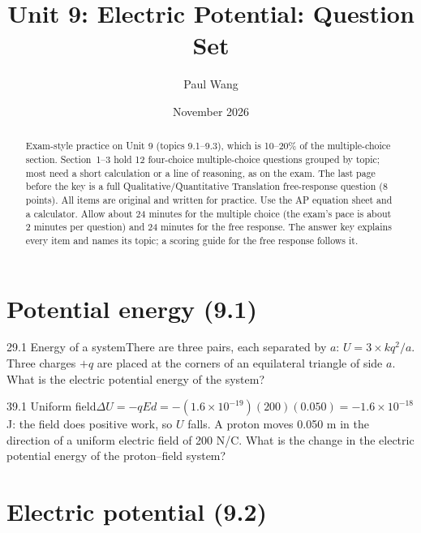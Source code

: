 \documentclass[11pt]{article}
\title{Unit 9: Electric Potential: Question Set}
\author{Paul Wang}
\date{November 2026}
\begin{document}
\maketitle

\begin{abstract}
Exam-style practice on Unit 9 (topics 9.1--9.3), which is 10--20\% of the multiple-choice section. Section~1--3 hold 12 four-choice multiple-choice questions grouped by topic; most need a short calculation or a line of reasoning, as on the exam. The last page before the key is a full Qualitative/Quantitative Translation free-response question (8 points). All items are original and written for practice. Use the AP equation sheet and a calculator. Allow about 24 minutes for the multiple choice (the exam's pace is about 2 minutes per question) and 24 minutes for the free response. The answer key explains every item and names its topic; a scoring guide for the free response follows it.
\end{abstract}


\section{Potential energy (9.1)}

\begin{q}{2}{9.1 Energy of a system}{There are three pairs, each separated by $a$: $U = 3 \times kq^2/a$.}
Three charges $+q$ are placed at the corners of an equilateral triangle of side $a$. What is the electric potential energy of the system?
\end{q}
\begin{q}{3}{9.1 Uniform field}{$\Delta U = -qEd = -(1.6\times10^{-19})(200)(0.050) = -1.6\times10^{-18}$ J: the field does positive work, so $U$ falls.}
A proton moves 0.050 m in the direction of a uniform electric field of 200 N/C. What is the change in the electric potential energy of the proton--field system?
\end{q}

\section{Electric potential (9.2)}
\end{document}

